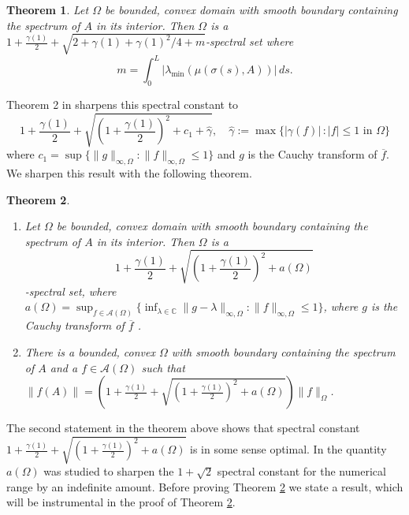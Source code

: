 \documentclass{article}
\newtheorem{Theorem}{Theorem}[section]
\begin{document}
\begin{Theorem}
Let $\Omega$ be bounded, convex domain with smooth boundary containing the spectrum of $A$
in its interior.  Then
$\Omega$ is a $ 1 + \frac{\gamma(1)}{2} + \sqrt{2 + \gamma(1) + \gamma(1)^2 / 4 + m}$-spectral set where 
\begin{equation}
m = \int_0^L | \lambda_{\min} ( \mu ( \sigma (s) , A )) |\,ds .
\label{gamma(1)_hat}
\end{equation}
\label{theorem:1}
\end{Theorem}
\noindent Theorem 2 in \cite{crouzeix2019spectral} sharpens this spectral constant to 
$$
1 + \frac{\gamma(1)}{2} + \sqrt{\left(1+ \frac{\gamma(1)}{2}\right)^2 + c_1 + \hat{\gamma}}, \quad \hat\gamma  :=\max\{|\gamma(f)|\,: |f |\leq 1 \text{ in }\Omega\}
$$
where $c_1 = \sup \{ \|g\|_{\infty, \Omega} : \|f\|_{\infty, \Omega}\leq 1 \}$ and $g$ is the Cauchy transform of $\overline{f}$. We sharpen this result with the following theorem.
\begin{Theorem}\label{main}
    \begin{enumerate}
        \item Let $\Omega$ be bounded, convex domain with smooth boundary containing the spectrum of $A$
in its interior.  Then
$\Omega$ is a \begin{equation}\label{maineq}
    1 + \frac{\gamma(1)}{2} + \sqrt{\left(1+ \frac{\gamma(1)}{2}\right)^2 + a(\Omega)}
\end{equation} 
-spectral set, where $a(\Omega) = \sup_{f \in \mathcal{A}(\Omega)}\{ \inf_{\lambda \in \mathbb{C}}\|g- \lambda \|_{\infty , \Omega} :  \|f\|_{\infty, \Omega} \leq 1  \}$, where $g$ is the Cauchy transform of $\overline{f}$ .
\item There is a bounded, convex $\Omega$ with smooth boundary containing the spectrum of $A$ and a $f \in \mathcal{A}(\Omega)$ such that $\|f(A)\| = \left(1 + \frac{\gamma(1)}{2} + \sqrt{\left(1+ \frac{\gamma(1)}{2}\right)^2 + a(\Omega)}\right)\|f\|_{\Omega}$.
\end{enumerate}
\end{Theorem}
The second statement in the theorem above shows that spectral constant $1 + \frac{\gamma(1)}{2} + \sqrt{\left(1+ \frac{\gamma(1)}{2}\right)^2 + a(\Omega)}$ is in some sense optimal. In \cite{malman2024double} the quantity $a(\Omega)$ was studied to sharpen the $1+ \sqrt{2}$ spectral constant for the numerical range by an indefinite amount. Before proving Theorem \ref{main} we state a result, which will be instrumental in the proof of Theorem \ref{main}.
\end{document}

